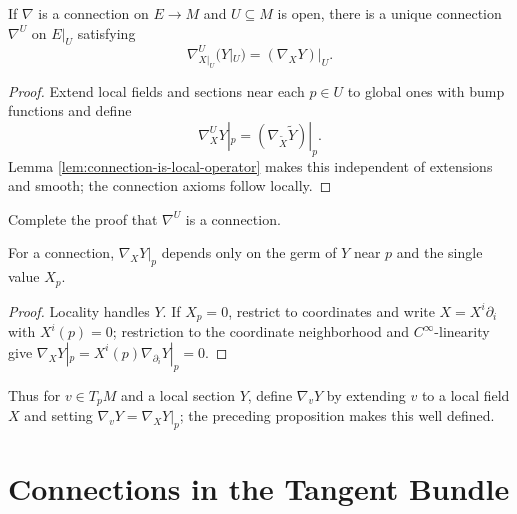 \begin{proposition}\label{prop:connection-restriction}
If $\nabla$ is a connection on $E\to M$ and $U\subseteq M$ is open, there is a unique connection $\nabla^U$ on $E|_U$ satisfying
\begin{equation}
\nabla^U_{X|_U}(Y|_U)=(\nabla_XY)|_U.\tag{4.6}
\end{equation}
\end{proposition}
\begin{proof}
\sketch Extend local fields and sections near each $p\in U$ to global ones with bump functions and define
\begin{equation}
\nabla^U_XY|_p=(\nabla_{\widetilde X}\widetilde Y)|_p.\tag{4.7}
\end{equation}
Lemma \ref{lem:connection-is-local-operator} makes this independent of extensions and smooth; the connection axioms follow locally.
\end{proof}

\begin{exercise}\label{exer:connection-restriction-is-connection}
Complete the proof that $\nabla^U$ is a connection.
\end{exercise}

\begin{proposition}\label{prop:covariant-deriv-dependence-at-point}
\leanok
For a connection, $\nabla_XY|_p$ depends only on the germ of $Y$ near $p$ and the single value $X_p$.
\end{proposition}
\begin{proof}
\leanok
\sketch Locality handles $Y$. If $X_p=0$, restrict to coordinates and write $X=X^i\partial_i$ with $X^i(p)=0$; restriction to the coordinate neighborhood and $C^\infty$-linearity give $\nabla_XY|_p=X^i(p)\nabla_{\partial_i}Y|_p=0$.
\end{proof}

Thus for $v\in T_pM$ and a local section $Y$, define $\nabla_vY$ by extending $v$ to a local field $X$ and setting $\nabla_vY=\nabla_XY|_p$; the preceding proposition makes this well defined.

\section{Connections in the Tangent Bundle}

